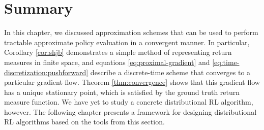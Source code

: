 \section{Summary}
In this chapter, we discussed approximation schemes that can be used
to perform tractable approximate policy evaluation in a convergent
manner. In particular, Corollary \ref{cor:shjb} demonstrates a simple
method of representing return measures in finite space, and equations
\eqref{eq:proximal-gradient} and
\eqref{eq:time-discretization:pushforward} describe a discrete-time
scheme that converges to a particular gradient flow. Theorem
\ref{thm:convergence} shows that this gradient flow has a unique
stationary point, which is satisfied by the ground truth return
measure function. We have yet to study a concrete distributional RL
algorithm, however. The following chapter presents a framework for
designing distributional RL algorithms based on the tools from this section.
